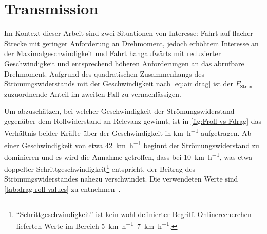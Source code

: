 	\section{Transmission}\label{sec:transmission}
		Im Kontext dieser Arbeit sind zwei Situationen von Interesse: Fahrt auf flacher Strecke mit geringer Anforderung an Drehmoment, jedoch erhöhtem Interesse an der Maximalgeschwindigkeit und Fahrt hangaufwärts mit reduzierter Geschwindigkeit und entsprechend höheren Anforderungen an das abrufbare Drehmoment.
		Aufgrund des quadratischen Zusammenhangs des Strömungswiderstands mit der Geschwindigkeit nach \cref{eq:air drag} ist der \(F_\text{Ström}\) zuzuordnende Anteil im zweiten Fall zu vernachlässigen.

		Um abzuschätzen, bei welcher Geschwindigkeit der Strömungswiderstand gegenüber dem Rollwiderstand an Relevanz gewinnt, ist in \cref{fig:Froll vs Fdrag} das Verhältnis beider Kräfte über der Geschwindigkeit in \unit{\kilo\metre\per\hour} aufgetragen.
		Ab einer Geschwindigkeit von etwa \qty{42}{\kilo\metre\per\hour} beginnt der Strömungswiderstand zu dominieren und es wird die Annahme getroffen, dass bei \qty{10}{\kilo\metre\per\hour}, was etwa doppelter Schrittgeschwindigkeit\footnote{\hspace{1mm} ``Schrittgeschwindigkeit'' ist kein wohl definierter Begriff. Onlinerecherchen lieferten Werte im Bereich \qtyrange{5}{7}{\kilo\metre\per\hour}.} entspricht, der Beitrag des Strömungswiderstandes nahezu verschwindet.
		Die verwendeten Werte sind \cref{tab:drag roll values} zu entnehmen~\cites{GESTIS.Luft}{air.drag.human.body.VANINGENSCHENAU1982}{material.advances.skateboarding.WATERMAN1978}.

